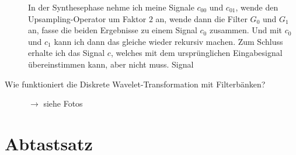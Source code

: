 \begin{description}
  	In der Synthesephase nehme ich meine Signale $ c_{00} $ und $ c_{01} $, wende den 
  	Upsampling-Operator um Faktor $ 2 $ an, wende dann die Filter $ G_{0} $ und $ G_{1} $ an, fasse 
  	die beiden Ergebnisse zu einem Signal $ c_{0} $ zusammen. Und mit $ c_{0} $ und $ c_{1} $ kann 
  	ich dann das gleiche wieder rekursiv machen. Zum Schluss erhalte ich das Signal $ c $, welches 
  	mit dem ursprünglichen Eingabesignal übereinstimmen kann, aber nicht muss.
  	Signal 
  \item [Wie funktioniert die Diskrete Wavelet-Transformation mit Filterbänken?] 
    $ \rightarrow $ siehe Fotos
\end{description}
\section{Abtastsatz}
